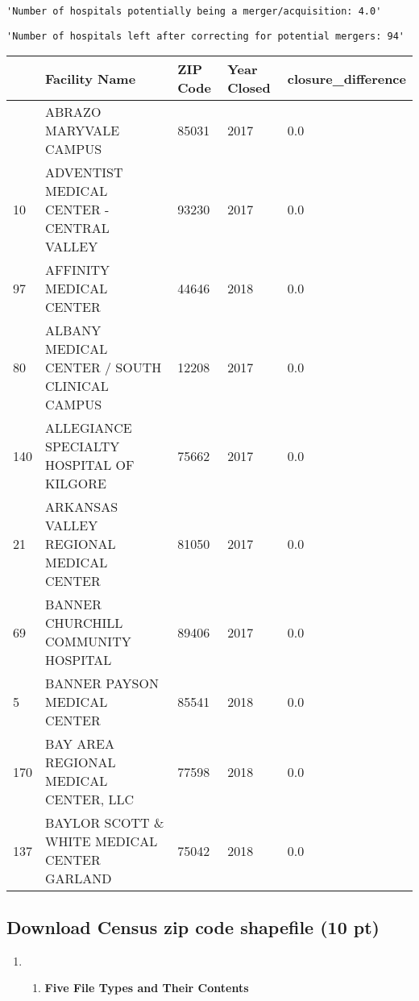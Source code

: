 \documentclass[
  letterpaper,
  DIV=11,
  numbers=noendperiod]{scrartcl}
\providecommand{\tightlist}{%
  \setlength{\itemsep}{0pt}\setlength{\parskip}{0pt}}\usepackage{longtable,booktabs,array}
\begin{document}
\begin{verbatim}
'Number of hospitals potentially being a merger/acquisition: 4.0'
\end{verbatim}

\begin{verbatim}
'Number of hospitals left after correcting for potential mergers: 94'
\end{verbatim}

\begin{longtable}[]{@{}lllll@{}}
\toprule\noalign{}
& Facility Name & ZIP Code & Year Closed & closure\_difference \\
\midrule\noalign{}
\endhead
\bottomrule\noalign{}
\endlastfoot
4 & ABRAZO MARYVALE CAMPUS & 85031 & 2017 & 0.0 \\
10 & ADVENTIST MEDICAL CENTER - CENTRAL VALLEY & 93230 & 2017 & 0.0 \\
97 & AFFINITY MEDICAL CENTER & 44646 & 2018 & 0.0 \\
80 & ALBANY MEDICAL CENTER / SOUTH CLINICAL CAMPUS & 12208 & 2017 &
0.0 \\
140 & ALLEGIANCE SPECIALTY HOSPITAL OF KILGORE & 75662 & 2017 & 0.0 \\
21 & ARKANSAS VALLEY REGIONAL MEDICAL CENTER & 81050 & 2017 & 0.0 \\
69 & BANNER CHURCHILL COMMUNITY HOSPITAL & 89406 & 2017 & 0.0 \\
5 & BANNER PAYSON MEDICAL CENTER & 85541 & 2018 & 0.0 \\
170 & BAY AREA REGIONAL MEDICAL CENTER, LLC & 77598 & 2018 & 0.0 \\
137 & BAYLOR SCOTT \& WHITE MEDICAL CENTER GARLAND & 75042 & 2018 &
0.0 \\
\end{longtable}

\subsection{Download Census zip code shapefile (10
pt)}\label{download-census-zip-code-shapefile-10-pt}

\begin{enumerate}
\def\labelenumi{\arabic{enumi}.}
\tightlist
\item
  \begin{enumerate}
  \def\labelenumii{\alph{enumii}.}
  \tightlist
  \item
    \textbf{Five File Types and Their Contents}
  \end{enumerate}
\end{enumerate}
\end{document}
